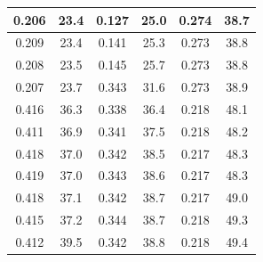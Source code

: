 \begin{table}[]
\begin{tabular}{|cccccc}
\multicolumn{1}{|c|}{0.206}   & \multicolumn{1}{c|}{23.4}     & \multicolumn{1}{c|}{0.127}     & \multicolumn{1}{c|}{25.0}     & \multicolumn{1}{c|}{0.274}     & \multicolumn{1}{c|}{38.7}     \\ \hline
\multicolumn{1}{|c|}{0.209}   & \multicolumn{1}{c|}{23.4}     & \multicolumn{1}{c|}{0.141}     & \multicolumn{1}{c|}{25.3}     & \multicolumn{1}{c|}{0.273}     & \multicolumn{1}{c|}{38.8}     \\ \hline
\multicolumn{1}{|c|}{0.208}   & \multicolumn{1}{c|}{23.5}     & \multicolumn{1}{c|}{0.145}     & \multicolumn{1}{c|}{25.7}     & \multicolumn{1}{c|}{0.273}     & \multicolumn{1}{c|}{38.8}     \\ \hline
\multicolumn{1}{|c|}{0.207}   & \multicolumn{1}{c|}{23.7}     & \multicolumn{1}{c|}{0.343}     & \multicolumn{1}{c|}{31.6}     & \multicolumn{1}{c|}{0.273}     & \multicolumn{1}{c|}{38.9}     \\ \hline
\multicolumn{1}{|c|}{0.416}   & \multicolumn{1}{c|}{36.3}     & \multicolumn{1}{c|}{0.338}     & \multicolumn{1}{c|}{36.4}     & \multicolumn{1}{c|}{0.218}     & \multicolumn{1}{c|}{48.1}     \\ \hline
\multicolumn{1}{|c|}{0.411}   & \multicolumn{1}{c|}{36.9}     & \multicolumn{1}{c|}{0.341}     & \multicolumn{1}{c|}{37.5}     & \multicolumn{1}{c|}{0.218}     & \multicolumn{1}{c|}{48.2}     \\ \hline
\multicolumn{1}{|c|}{0.418}   & \multicolumn{1}{c|}{37.0}     & \multicolumn{1}{c|}{0.342}     & \multicolumn{1}{c|}{38.5}     & \multicolumn{1}{c|}{0.217}     & \multicolumn{1}{c|}{48.3}     \\ \hline
\multicolumn{1}{|c|}{0.419}   & \multicolumn{1}{c|}{37.0}     & \multicolumn{1}{c|}{0.343}     & \multicolumn{1}{c|}{38.6}     & \multicolumn{1}{c|}{0.217}     & \multicolumn{1}{c|}{48.3}     \\ \hline
\multicolumn{1}{|c|}{0.418}   & \multicolumn{1}{c|}{37.1}     & \multicolumn{1}{c|}{0.342}     & \multicolumn{1}{c|}{38.7}     & \multicolumn{1}{c|}{0.217}     & \multicolumn{1}{c|}{49.0}     \\ \hline
\multicolumn{1}{|c|}{0.415}   & \multicolumn{1}{c|}{37.2}     & \multicolumn{1}{c|}{0.344}     & \multicolumn{1}{c|}{38.7}     & \multicolumn{1}{c|}{0.218}     & \multicolumn{1}{c|}{49.3}     \\ \hline
\multicolumn{1}{|c|}{0.412}   & \multicolumn{1}{c|}{39.5}     & \multicolumn{1}{c|}{0.342}     & \multicolumn{1}{c|}{38.8}     & \multicolumn{1}{c|}{0.218}     & \multicolumn{1}{c|}{49.4}     \\ \hline

\end{tabular}
\end{table}
